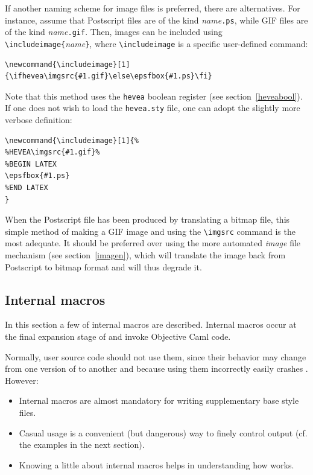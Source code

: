If another naming scheme for image files is preferred, there are
alternatives.
For instance, assume that Postscript files are of the kind
\textit{name}\texttt{.ps}, while GIF files are of the kind
\textit{name}\texttt{.gif}.
Then, images can be included using
\verb+\includeimage{+\textit{name}\verb+}+, where
\verb+\includeimage+ is a specific user-defined command:
\begin{verbatim}
\newcommand{\includeimage}[1]{\ifhevea\imgsrc{#1.gif}\else\epsfbox{#1.ps}\fi}
\end{verbatim}
Note that this method uses the \texttt{hevea} boolean register (see
section~\ref{heveabool}).
If one does not wish to load the \texttt{hevea.sty} file,
one can adopt the slightly more verbose definition:
\begin{verbatim}
\newcommand{\includeimage}[1]{%
%HEVEA\imgsrc{#1.gif}%
%BEGIN LATEX
\epsfbox{#1.ps}
%END LATEX
}
\end{verbatim}
When the Postscript file has been produced by
translating a bitmap file, this simple method of making a GIF image and
using the \verb+\imgsrc+ command 
is the most adequate.
It should be preferred over using the more automated \textit{image} file
mechanism (see section~\ref{imagen}),
which will translate the image back from
Postscript to bitmap format and will thus degrade it.




\subsection{Internal \label{internal}macros}
In this section a few of \hevea{} internal macros are
described.
Internal macros occur at the final expansion stage of \hevea{} and
invoke Objective Caml code.

Normally, user source code should not use them, since
their behavior may change from one version of \hevea{} to another and
because using them incorrectly easily
crashes \hevea.
However:
\begin{itemize}
\item Internal macros
are almost mandatory for writing supplementary base style files.
\item Casual usage is a convenient (but dangerous) way to finely control
output (cf. the examples in the next section).
\item Knowing a little about internal macros helps in understanding how
\hevea{} works.
\end{itemize}


